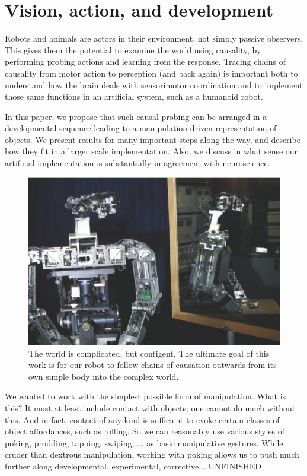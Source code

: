 
\section{Vision, action, and development}

Robots and animals are actors in their environment, not simply passive
observers.  This gives them the potential to examine the world using
causality, by performing probing actions and learning from the
response.  Tracing chains of causality from motor action to perception
(and back again) is important both to understand how the brain deals
with sensorimotor coordination and to implement those same functions
in an artificial system, such as a humanoid robot.

In this paper, we propose that such causal probing can be arranged in
a developmental sequence leading to a manipulation-driven
representation of objects.  We present results for many important steps
along the way, and describe how they fit in a larger scale implementation.
Also, we discuss in what sense our artificial implementation is substantially 
in agreement with neuroscience. 

\begin{figure}[tbh]
\begin{center}
\includegraphics[width=12cm]{mirror-cog.eps}
\caption{ 
\label{fig:mirror-cog}
%
The world is complicated, but contigent.
The ultimate goal of this work is for our robot to follow chains of
causation outwards from its own simple body into the complex world.
%
}
\end{center}
\end{figure}

We wanted to work with the simplest possible form of manipulation.
What is this?  It must at least include contact with objects; one
cannot do much without this.  And in fact, contact of any kind is
sufficient to evoke certain classes of object affordances, such as
rolling.  So we can reasonably use various styles of poking, prodding,
tapping, swiping, ... as basic manipulative gestures.  While cruder
than dextrous manipulation, working with poking allows us to push
much further along developmental, experimental, corrective... UNFINISHED


